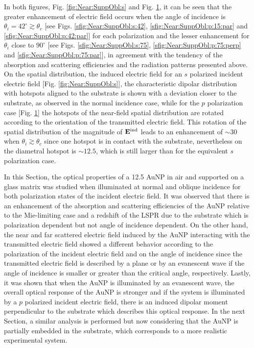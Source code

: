 \begin{figure}
{    }
    \label{fig:Near:SuppObl:p}
  \end{figure}

In both figures, Fig. \ref{fig:Near:SuppObl:s} and Fig. \ref{fig:Near:SuppObl:p}, it can be seen that the greater enhancement of electric field occurs when the angle of incidence is $\theta_i = 42^ \circ \gtrsim \theta_c$ [see Figs. \ref{sfig:Near:SuppObl:s:42}, \ref{sfig:Near:SuppObl:p:15:par} and \ref{sfig:Near:SuppObl:p:42:par}] for each polarization and the lesser enhancement for $\theta_i$ close to $90^\circ$ [see Figs. \ref{sfig:Near:SuppObl:s:75}, \ref{sfig:Near:SuppObl:p:75:perp} and \ref{sfig:Near:SuppObl:p:75:par}], in agreement with the tendency of the absorption and scattering efficiencies and the radiation patterns presented above. On the spatial distribution, the induced electric field for an $s$ polarized incident electric field [Fig. \ref{fig:Near:SuppObl:s}], the characteristic dipolar distribution with hotspots aligned to the substrate is shown with a deviation closer to the substrate, as observed in the normal incidence case, while for the $p$ polarization case [Fig. \ref{fig:Near:SuppObl:p}] the hotspots of the near-field spatial distribution are rotated according to the orientation of the transmitted electric field. This rotation of the spatial distribution of the magnitude of $\vb{E}^\text{ind}$ leads to an enhancement of $\sim 30$ when $\theta_i \gtrsim \theta_c$ since one hotspot is in contact with the substrate, nevertheless on the diametral hotspot is $\sim 12.5$, which is still larger than for the equivalent $s$ polarization case.

In this Section, the optical properties of a 12.5 AuNP in air and supported on a glass matrix was studied when illuminated at normal and oblique incidence for both polarization states of the incident electric field. It was observed that there is an enhancement of the absorption and scattering efficiencies of the AuNP relative to the Mie-limiting case and a redshift of the LSPR due to the substrate which is polarization dependent but not angle of incidence dependent. On the other hand, the near and far scattered electric field induced by the AuNP interacting with the transmitted electric field showed a different behavior according to the polarization of the incident electric field and on the angle of incidence since the transmitted electric field is described by a plane or by an evanescent wave if the angle of incidence is smaller or greater than the critical angle, respectively. Lastly, it was shown that when the AuNP is illuminated by an evanescent wave, the overall optical response of the AuNP is stronger and  if the system is illuminated by a $p$ polarized incident electric field, there is an induced dipolar moment perpendicular to the substrate which describes this optical response. In the next Section, a similar analysis is performed but now considering that the AuNP is partially embedded in the substrate, which corresponds to a more realistic experimental system.
